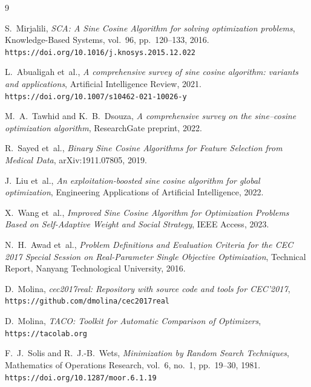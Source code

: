 \documentclass[12pt,a4paper]{article}
\begin{document}

\clearpage
{}
{}
\begin{thebibliography}{9}
 
S.~Mirjalili,
\textit{SCA: A Sine Cosine Algorithm for solving optimization problems},
Knowledge-Based Systems, vol.~96, pp.~120--133, 2016.
\texttt{https://doi.org/10.1016/j.knosys.2015.12.022}
 
L.~Abualigah et~al.,
\textit{A comprehensive survey of sine cosine algorithm: variants and applications},
Artificial Intelligence Review, 2021.
\texttt{https://doi.org/10.1007/s10462-021-10026-y}
 
M.~A.~Tawhid and K.~B.~Dsouza,
\textit{A comprehensive survey on the sine--cosine optimization algorithm},
ResearchGate preprint, 2022.
 
R.~Sayed et~al.,
\textit{Binary Sine Cosine Algorithms for Feature Selection from Medical Data},
arXiv:1911.07805, 2019.
 
J.~Liu et~al.,
\textit{An exploitation-boosted sine cosine algorithm for global optimization},
Engineering Applications of Artificial Intelligence, 2022.
 
X.~Wang et~al.,
\textit{Improved Sine Cosine Algorithm for Optimization Problems Based on Self-Adaptive Weight and Social Strategy},
IEEE Access, 2023.
 
N.~H.~Awad et~al.,
\textit{Problem Definitions and Evaluation Criteria for the CEC 2017 Special Session on Real-Parameter Single Objective Optimization},
Technical Report, Nanyang Technological University, 2016.
 
D.~Molina,
\textit{cec2017real: Repository with source code and tools for CEC'2017},
\texttt{https://github.com/dmolina/cec2017real}
 
D.~Molina,
\textit{TACO: Toolkit for Automatic Comparison of Optimizers},
\texttt{https://tacolab.org}

F.~J.~Solis and R.~J.-B.~Wets,
\textit{Minimization by Random Search Techniques},
Mathematics of Operations Research, vol.~6, no.~1, pp.~19--30, 1981.
\texttt{https://doi.org/10.1287/moor.6.1.19}
 
\end{thebibliography}
\end{document}
